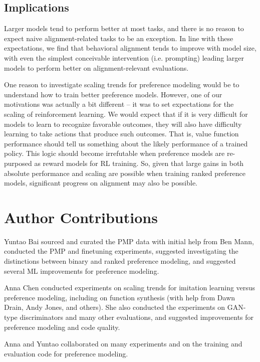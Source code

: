 \subsection{Implications}

Larger models tend to perform better at most tasks, and there is no reason to expect naive alignment-related tasks to be an exception.  In line with these expectations, we find that behavioral alignment tends to improve with model size, with even the simplest conceivable intervention (i.e. prompting) leading larger models to perform better on alignment-relevant evaluations.

One reason to investigate scaling trends for preference modeling would be to understand how to train better preference models.  However, one of our motivations was actually a bit different -- it was to set expectations for the scaling of reinforcement learning.  We would expect that if it is very difficult for models to learn to recognize favorable outcomes, they will also have difficulty learning to take actions that produce such outcomes.  That is, value function performance should tell us something about the likely performance of a trained policy.  This logic should become irrefutable when preference models are re-purposed as reward models for RL training.  So, given that large gains in both absolute performance and scaling  are possible when training ranked preference models, significant progress on alignment may also be possible.

\section*{Author Contributions}
\label{sec:ContributionStatement}

Yuntao Bai sourced and curated the PMP data with initial help from Ben Mann, conducted the PMP and finetuning experiments, suggested investigating the distinctions between binary and ranked preference modeling, and suggested several ML improvements for preference modeling.  

Anna Chen conducted experiments on scaling trends for imitation learning versus preference modeling, including on function synthesis (with help from Dawn Drain, Andy Jones, and others).  She also conducted the experiments on GAN-type discriminators and many other evaluations, and suggested improvements for preference modeling and code quality.

Anna and Yuntao collaborated on many experiments and on the training and evaluation code for preference modeling.

